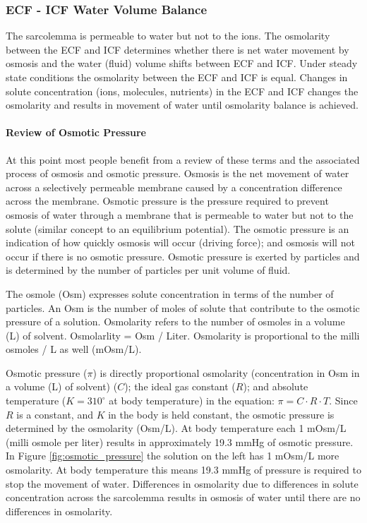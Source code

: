 \subsubsection{ECF - ICF Water Volume Balance}

The sarcolemma is permeable to water but not to the ions. The osmolarity between the ECF and ICF determines whether there is net water movement by osmosis and the water (fluid) volume shifts between ECF and ICF. Under steady state conditions the osmolarity between the ECF and ICF is equal. Changes in solute concentration (ions, molecules, nutrients) in the ECF and ICF changes the osmolarity and results in movement of water until osmolarity balance is achieved.

\paragraph{Review of Osmotic Pressure}

At this point most people benefit from a review of these terms and the associated process of osmosis and osmotic pressure. Osmosis is the net movement of water across a selectively permeable membrane caused by a concentration difference across the membrane. Osmotic pressure is the pressure required to prevent osmosis of water through a membrane that is permeable to water but not to the solute (similar concept to an equilibrium potential). The osmotic pressure is an indication of how quickly osmosis will occur (driving force); and osmosis will not occur if there is no osmotic pressure. Osmotic pressure is exerted by particles and is determined by the number of particles per unit volume of fluid. 

The osmole (Osm) expresses solute concentration in terms of the number of particles. An Osm is the number of moles of solute that contribute to the osmotic pressure of a solution. Osmolarity refers to the number of osmoles in a volume (L) of solvent. Osmolarlity = Osm / Liter. Osmolarity is proportional to the milli osmoles / L as well (mOsm/L).

Osmotic pressure ($\pi$) is directly proportional osmolarity (concentration in Osm in a volume (L) of solvent) ($C$); the ideal gas constant ($R$); and absolute temperature ($K = 310^{\circ}$ at body temperature) in the equation: $\pi = C \cdot R \cdot T$. Since $R$ is a constant, and $K$ in the body is held constant, the osmotic pressure is determined by the osmolarity (Osm/L). At body temperature each 1 mOsm/L (milli osmole per liter) results in approximately 19.3 mmHg of osmotic pressure. In Figure \ref{fig:osmotic_pressure} the solution on the left has 1 mOsm/L more osmolarity. At body temperature this means 19.3 mmHg of pressure is required to stop the movement of water. Differences in osmolarity due to differences in solute concentration across the sarcolemma results in osmosis of water until there are no differences in osmolarity.

